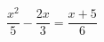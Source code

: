 \begin{ex}[type=equation]
	\begin{condition}
		\( \dfrac{x^2}{5}-\dfrac{2x}{3}=\dfrac{x+5}{6} \)
	\end{condition}
\end{ex}